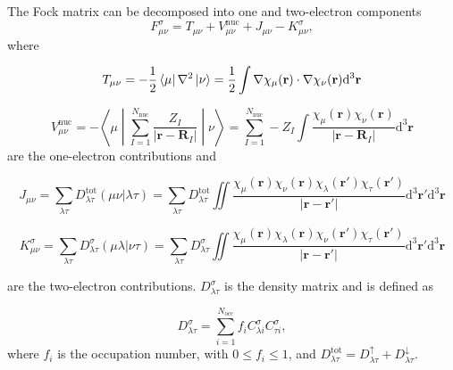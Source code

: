 \documentclass{article}
\begin{document}
The Fock matrix can be decomposed into one and two-electron components
\begin{equation}
  F^\sigma_{\mu\nu} = T_{\mu\nu} + V_{\mu\nu}^{\text{nuc}} +
  J_{\mu\nu} - K^\sigma_{\mu\nu},
  \label{eq:FockComponents}
\end{equation}
where

\begin{equation}
  T_{\mu\nu} = -\frac{1}{2} \bra{\mu} \nabla^2 \ket{\nu} =
  \frac{1}{2}\int \nabla\chi_\mu(\mathbf r) \cdot
  \nabla\chi_\nu (\mathbf r) \mathrm d ^3\mathbf r
  \label{eq:kinetic}
\end{equation}

\begin{equation}
  V^{\text{nuc}}_{\mu\nu}
  = -\left \langle \mu \middle |
  \sum_{I=1}^{N_{\text{nuc}}} \frac{Z_I}{|\mathbf{r}-\mathbf
  R_I|} \middle | \nu \right \rangle
  =\sum_{I=1}^{N_{\text{nuc}}}  -Z_I\int
  \frac{\chi_\mu(\mathbf r) \chi_\nu (\mathbf r)}{|\mathbf r -
  \mathbf R_I|} \mathrm d ^3\mathbf r
  \label{eq:nuc}
\end{equation}
are the one-electron contributions and

\begin{equation}
  J_{\mu\nu} =
  \sum_{\lambda\tau}D^\text{tot}_{\lambda\tau}(\mu \nu |
  \lambda \tau) =\sum_{\lambda\tau}D^\text{tot}_{\lambda\tau}
  \iint \frac{\chi_\mu(\mathbf r) \chi_\nu (\mathbf r)
  \chi_\lambda(\mathbf r') \chi_\tau   (\mathbf r')}{|\mathbf r
  - \mathbf{r}'| }  \mathrm d ^3\mathbf r'  \mathrm d ^3\mathbf r
  \label{eq:coulomb}
\end{equation}

\begin{equation}
  K^\sigma_{\mu\nu} =
  \sum_{\lambda\tau}D^\sigma_{\lambda\tau}(\mu \lambda | \nu
  \tau   ) =\sum_{\lambda\tau   }D^\sigma_{\lambda\tau   }
  \iint \frac{\chi_\mu(\mathbf r) \chi_\lambda (\mathbf r)
  \chi_\nu(\mathbf r') \chi_\tau   (\mathbf r')}{|\mathbf r -
  \mathbf{r}'| } \mathrm d^3\mathbf r' \mathrm d^3\mathbf r
  \label{eq:exchange}
\end{equation}

are the two-electron contributions. $D^\sigma_{\lambda\tau}$ is the
density matrix and is defined as

\begin{equation}
  D^\sigma_{\lambda\tau} =
  \sum_{i=1}^{N_\text{occ}}f_iC^\sigma_{\lambda
  i}C^\sigma_{\tau i},
  \label{eq:density_matrix}
\end{equation}
where $f_i$ is the occupation number, with $0 \leq f_i \leq 1$, and
$D^\text{tot}_{\lambda\tau} = D^\uparrow_{\lambda\tau} +
D^\downarrow_{\lambda\tau}$.
\end{document}
